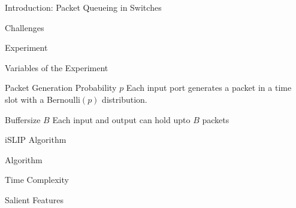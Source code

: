 
\begin{section}{Introduction: Packet Queueing in Switches}


\end{section}


\begin{section}{Challenges}

\end{section}

\begin{section}{Experiment}


\end{section}

\begin{section}{Variables of the Experiment}

    \begin{subsection}{Packet Generation Probability $p$}
        Each input port generates a packet in a time slot with a Bernoulli$(p)$ distribution.
    \end{subsection}

    \begin{subsection}{Buffersize $B$}
    Each input and output can hold upto $B$ packets
    \end{subsection}

\end{section}

\begin{section}{iSLIP Algorithm}
    \begin{subsection}{Algorithm}
        
    \end{subsection}

    \begin{subsection}{Time Complexity}
        
    \end{subsection}

    \begin{subsection}{Salient Features}

    \end{subsection}

\end{section}


